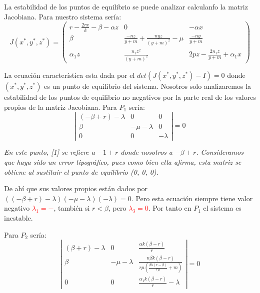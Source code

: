 \documentclass{wscpaperproc}
\theoremstyle{wsc}
\begin{document}
La estabilidad de los puntos de equilibrio se puede analizar calculanfo la matriz Jacobiana. Para nuestro sistema sería:
$$ J(x^*, y^*, z^*) = \left(
	\begin{array}{ccc}
			r-\frac{2rx}{k}-\beta-\alpha z & 0                                       & -\alpha x                       \\
			\beta                          & \frac{-nz}{y+m}+\frac{nyz}{(y+m)^2}-\mu & \frac{-ny}{y+m}                 \\
			\alpha_1z                      & \frac{n_1z^2}{(y+m)^2}                  & 2pz-\frac{2n_1z}{y+m}+\alpha_1x
		\end{array}
	\right)$$

La ecuación característica esta dada por el $det(J(x^*, y^*, z^*)-I)=0$ donde $(x^*, y^*, z^*)$ es un punto de equilibrio del sistema.
Nosotros solo analizaremos la estabilidad de los puntos de equilibrio no negativos por la parte real de los valores propios de la matriz Jacobiana.
\vspace*{0.5cm}
Para $P_1$ sería:
$$\left|
	\begin{array}{ccc}
		(-\beta+r)-\lambda & 0            & 0        \\
		\beta              & -\mu-\lambda & 0        \\
		0                  & 0            & -\lambda
	\end{array}
	\right| =0$$

{\it En este punto, [1] se refiere a $-1+r$ donde nosotros a $-\beta+r$. Consideramos que haya sido un error tipográfico, pues como bien ella
		afirma, esta matriz se obtiene al sustituir el punto de equilibrio (0, 0, 0).}


De ahí que sus valores propios están dados por $((-\beta+r)-\lambda)(-\mu-\lambda)(-\lambda)=0$. Pero esta ecuación siempre tiene valor negativo
\textcolor{red}{$\lambda_1=-$}, también si $r<\beta$, pero \textcolor{red}{$\lambda_3=0$}. Por tanto en $P_1$ el sistema es inestable.

\vspace*{0.5cm}

Para $P_2$ sería:
$$\left|
	\begin{array}{ccc}
		(\beta+r)-\lambda & 0            & \frac{\alpha k(\beta-r)}{r}                                      \\
		\beta             & -\mu-\lambda & \frac{n\beta k(\beta-r)}{r\mu (\frac{\beta k(r-\beta)}{r\mu}+m)} \\
		0                 & 0            & \frac{\alpha_1 k(\beta-r)}{r}-\lambda
	\end{array}
	\right| =0$$
\end{document}
